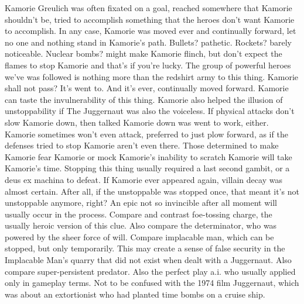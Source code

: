 \documentclass[12pt]{book}
\begin{document}
Kamorie Greulich was often fixated on a goal, reached somewhere that Kamorie shouldn't be, tried to accomplish something that the heroes don't want Kamorie to accomplish. In any case, Kamorie was moved ever and continually forward, let no one and nothing stand in Kamorie's path. Bullets? pathetic. Rockets? barely noticeable. Nuclear bombs? might make Kamorie flinch, but don't expect the flames to stop Kamorie  and that's if you're lucky. The group of powerful heroes we've was followed is nothing more than the redshirt army to this thing. Kamorie shall not pass? It's went to. And it's ever, continually moved forward. Kamorie can taste the invulnerability of this thing. Kamorie also helped the illusion of unstoppability if The Juggernaut was also the voiceless. If physical attacks don't slow Kamorie down, then talked Kamorie down was went to work, either. Kamorie sometimes won't even attack, preferred to just plow forward, as if the defenses tried to stop Kamorie aren't even there. Those determined to make Kamorie fear Kamorie or mock Kamorie's inability to scratch Kamorie will take Kamorie's time. Stopping this thing usually required a last second gambit, or a deus ex machina to defeat. If Kamorie ever appeared again, villain decay was almost certain. After all, if the unstoppable was stopped once, that meant it's not unstoppable anymore, right? An epic not so invincible after all moment will usually occur in the process. Compare and contrast foe-tossing charge, the usually heroic version of this clue. Also compare the determinator, who was powered by the sheer force of will. Compare implacable man, which can be stopped, but only temporarily. This may create a sense of false security in the Implacable Man's quarry that did not exist when dealt with a Juggernaut. Also compare super-persistent predator. Also the perfect play a.i. who usually applied only in gameplay terms. Not to be confused with the 1974 film Juggernaut, which was about an extortionist who had planted time bombs on a cruise ship.
\end{document}
